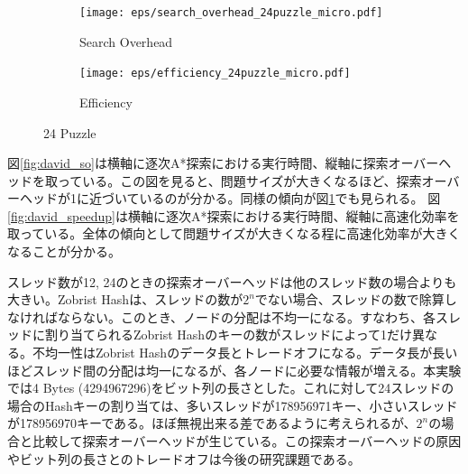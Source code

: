 \documentclass[uplatex]{jsarticle}
\begin{document}
\begin{figure}
	\centering
	\begin{subfigure}{0.45\columnwidth}
		\texttt{[image: eps/search\_overhead\_24puzzle\_micro.pdf]}	
		\caption{Search Overhead}
		\label{fig:david_so_24}
	\end{subfigure}
	\begin{subfigure}{0.45\columnwidth}
		\texttt{[image: eps/efficiency\_24puzzle\_micro.pdf]}	
		\caption{Efficiency}
		\label{fig:david_speedup_24}
	\end{subfigure}
	\caption{24 Puzzle}
	\label{fig:24_david}
\end{figure}
図\ref{fig:david_so}は横軸に逐次A*探索における実行時間、縦軸に探索オーバーヘッドを取っている。この図を見ると、問題サイズが大きくなるほど、探索オーバーヘッドが1に近づいているのが分かる。同様の傾向が図\ref{fig:david_so_24}でも見られる。
図\ref{fig:david_speedup}は横軸に逐次A*探索における実行時間、縦軸に高速化効率を取っている。全体の傾向として問題サイズが大きくなる程に高速化効率が大きくなることが分かる。
\newline


スレッド数が12, 24のときの探索オーバーヘッドは他のスレッド数の場合よりも大きい。Zobrist Hashは、スレッドの数が$2^n$でない場合、スレッドの数で除算しなければならない。このとき、ノードの分配は不均一になる。すなわち、各スレッドに割り当てられるZobrist Hashのキーの数がスレッドによって1だけ異なる。不均一性はZobrist Hashのデータ長とトレードオフになる。データ長が長いほどスレッド間の分配は均一になるが、各ノードに必要な情報が増える。本実験では4 Bytes (4294967296)をビット列の長さとした。これに対して24スレッドの場合のHashキーの割り当ては、多いスレッドが178956971キー、小さいスレッドが178956970キーである。ほぼ無視出来る差であるように考えられるが、$2^n$の場合と比較して探索オーバーヘッドが生じている。この探索オーバーヘッドの原因やビット列の長さとのトレードオフは今後の研究課題である。
\newline
\end{document}
